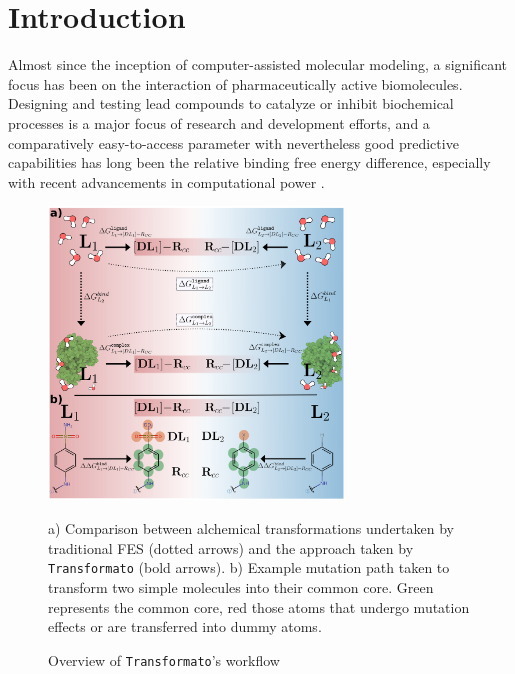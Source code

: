 \documentclass[oneside]{scrreprt}
\begin{document}
\begingroup
\let\clearpage\relax
\renewcommand\contentsname{Table of Contents}
\tableofcontents
{}
\endgroup
\chapter{Introduction}
Almost since the inception of computer-assisted molecular modeling, a significant focus has been on the interaction of pharmaceutically active biomolecules. Designing and testing lead compounds to catalyze or inhibit biochemical processes is a major focus of research and development efforts, and a comparatively easy-to-access parameter with nevertheless good predictive capabilities has long been the relative binding free energy difference, especially with recent advancements in computational power \cite{cournia_relative_2017}.

\begin{figure}[h]
    \begin{center}
        
    
    \includegraphics[width=0.7\textwidth]{alchemical_path_v5.png}
    \end{center}
    \caption{Overview of \texttt{Transformato}'s workflow}
    a) Comparison between alchemical transformations undertaken by traditional FES (dotted arrows) and the approach taken by \texttt{Transformato} (bold arrows). b) Example mutation path taken to transform two simple molecules into their common core. Green represents the common core, red those atoms that undergo mutation effects or are transferred into dummy atoms.
    \label{fig:fesvstrafo}
\end{figure}
\end{document}
